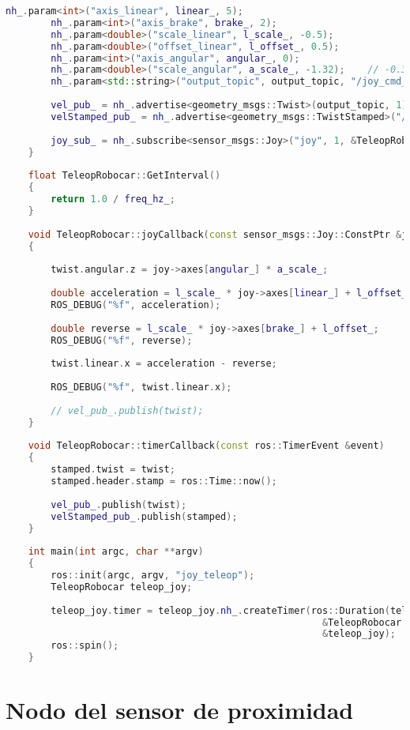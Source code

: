 \begin{lstlisting}[title={joy\_teleop.cpp},language=c++]
        nh_.param<int>("axis_linear", linear_, 5);
        nh_.param<int>("axis_brake", brake_, 2);
        nh_.param<double>("scale_linear", l_scale_, -0.5);
        nh_.param<double>("offset_linear", l_offset_, 0.5);
        nh_.param<int>("axis_angular", angular_, 0);
        nh_.param<double>("scale_angular", a_scale_, -1.32);    // -0.34
        nh_.param<std::string>("output_topic", output_topic, "/joy_cmd_vel");
    
        vel_pub_ = nh_.advertise<geometry_msgs::Twist>(output_topic, 1);
        velStamped_pub_ = nh_.advertise<geometry_msgs::TwistStamped>("/stamped_cmd_vel", 1);
    
        joy_sub_ = nh_.subscribe<sensor_msgs::Joy>("joy", 1, &TeleopRobocar::joyCallback, this);
    }
    
    float TeleopRobocar::GetInterval()
    {
        return 1.0 / freq_hz_;
    }
    
    void TeleopRobocar::joyCallback(const sensor_msgs::Joy::ConstPtr &joy)
    {
    
        twist.angular.z = joy->axes[angular_] * a_scale_;
    
        double acceleration = l_scale_ * joy->axes[linear_] + l_offset_;
        ROS_DEBUG("%f", acceleration);
    
        double reverse = l_scale_ * joy->axes[brake_] + l_offset_;
        ROS_DEBUG("%f", reverse);
    
        twist.linear.x = acceleration - reverse;
    
        ROS_DEBUG("%f", twist.linear.x);
    
        // vel_pub_.publish(twist);
    }
    
    void TeleopRobocar::timerCallback(const ros::TimerEvent &event)
    {
        stamped.twist = twist;
        stamped.header.stamp = ros::Time::now();
    
        vel_pub_.publish(twist);
        velStamped_pub_.publish(stamped);
    }
    
    int main(int argc, char **argv)
    {
        ros::init(argc, argv, "joy_teleop");
        TeleopRobocar teleop_joy;
    
        teleop_joy.timer = teleop_joy.nh_.createTimer(ros::Duration(teleop_joy.GetInterval()),
                                                        &TeleopRobocar::timerCallback,
                                                        &teleop_joy);
        ros::spin();
    }
\end{lstlisting}
\section{Nodo del sensor de proximidad}

